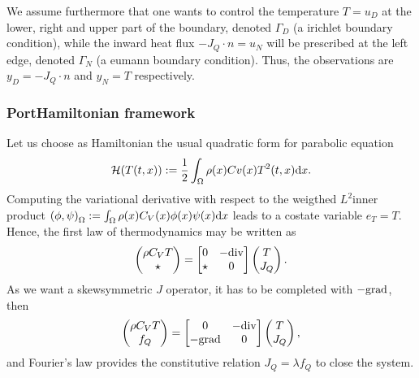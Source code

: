 \documentclass[letterpaper,10pt,english]{sphinxmanual}
\begin{document}
\sphinxAtStartPar
We assume furthermore that one wants to control the temperature
\(T = u_D\) at the lower, right and upper part of the boundary,
denoted \(\Gamma_D\) (a irichlet boundary condition), while
the inward heat flux \(-J_Q \cdot n = u_N\) will be prescribed at
the left edge, denoted \(\Gamma_N\) (a eumann boundary
condition). Thus, the observations are \(y_D = - J_Q \cdot n\) and
\(y_N = T\) respectively.


\subsubsection{Port\sphinxhyphen{}Hamiltonian framework}
\label{\detokenize{examples/heat:port-hamiltonian-framework}}
\sphinxAtStartPar
Let us choose as Hamiltonian the usual quadratic form for parabolic
equation
\begin{equation*}
\begin{split}\mathcal{H}(T(t,x)) := \frac{1}{2} \int_\Omega \rho(x) Cv(x) T^2(t,x) {\rm d}x.\end{split}
\end{equation*}
\sphinxAtStartPar
Computing the variational derivative with respect to the weigthed
\(L^2\)\sphinxhyphen{}inner product
\(\left( \phi, \psi \right)_\Omega := \int_\Omega \rho(x) C_V(x) \phi(x) \psi(x) {\rm d} x\)
leads to a co\sphinxhyphen{}state variable \(e_T = T\). Hence, the first law of
thermodynamics may be written as
\begin{equation*}
\begin{split}\begin{pmatrix} \rho C_V T \\ \star \end{pmatrix} = \begin{bmatrix} 0 & -{\rm div} \\ \star & 0 \end{bmatrix} \begin{pmatrix} T \\ J_Q \end{pmatrix}.\end{split}
\end{equation*}
\sphinxAtStartPar
As we want a  skew\sphinxhyphen{}symmetric \(J\) operator, it has to be
completed with \(-{\rm grad}\), then
\begin{equation*}
\begin{split}\begin{pmatrix} \rho C_V T \\ f_Q \end{pmatrix} = \begin{bmatrix} 0 & -{\rm div} \\ -{\rm grad} & 0 \end{bmatrix} \begin{pmatrix} T \\ J_Q \end{pmatrix},\end{split}
\end{equation*}
\sphinxAtStartPar
and Fourier’s law provides the constitutive relation
\(J_Q = \lambda f_Q\) to close the system.
\end{document}
